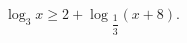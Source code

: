 \begin{ex}[type=inequality]
	\begin{condition}
		 $ \log_3 x\geqslant2 + \log$\tiny$_{\dfrac{1}{3}}$\normalsize$(x + 8) .$
	\end{condition}
\end{ex}